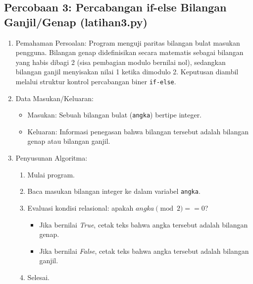 \documentclass[12pt,a4paper]{article}
\begin{document}
\subsection{Percobaan 3: Percabangan if-else Bilangan Ganjil/Genap (latihan3.py)}
\begin{enumerate}
    \item Pemahaman Persoalan: Program menguji paritas bilangan bulat masukan pengguna. Bilangan genap didefinisikan secara matematis sebagai bilangan yang habis dibagi 2 (sisa pembagian modulo bernilai nol), sedangkan bilangan ganjil menyisakan nilai 1 ketika dimodulo 2. Keputusan diambil melalui struktur kontrol percabangan biner \texttt{if-else}.
    \item Data Masukan/Keluaran:
    \begin{itemize}
        \item Masukan: Sebuah bilangan bulat (\texttt{angka}) bertipe integer.
        \item Keluaran: Informasi penegasan bahwa bilangan tersebut adalah bilangan genap atau bilangan ganjil.
    \end{itemize}
    \item Penyusunan Algoritma:
    \begin{enumerate}[label=\alph*.]
        \item Mulai program.
        \item Baca masukan bilangan integer ke dalam variabel \texttt{angka}.
        \item Evaluasi kondisi relasional: apakah $angka \pmod 2 == 0$?
        \begin{itemize}
            \item Jika bernilai \textit{True}, cetak teks bahwa angka tersebut adalah bilangan genap.
            \item Jika bernilai \textit{False}, cetak teks bahwa angka tersebut adalah bilangan ganjil.
        \end{itemize}
        \item Selesai.
    \end{enumerate}
\end{enumerate}
\end{document}
